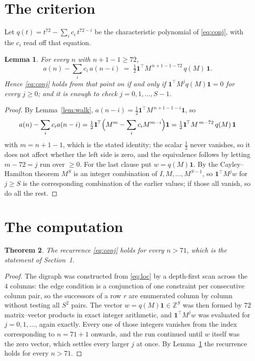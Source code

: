 \documentclass[11pt,a4paper]{article}
\theoremstyle{plain}
\newtheorem{theorem}{Theorem}
\newtheorem{lemma}[theorem]{Lemma}
\theoremstyle{definition}
\begin{document}
\section{The criterion}

Let $q(t)=t^{72}-\sum_i c_i\,t^{72-i}$ be the characteristic polynomial of
\eqref{eq:conj}, with the $c_i$ read off that equation.

\begin{lemma}\label{lem:crit}
For every $n$ with $n+1-1\ge72$,
\[
a(n)-\sum_i c_i\,a(n-i)\;=\;\tfrac1{2}\mathbf{1}^{\!\top}M^{\,n+1-1-72}\,q(M)\,\mathbf{1} .
\]
Hence \eqref{eq:conj} holds from that point on if and only if
$\mathbf{1}^{\!\top}M^{j}q(M)\mathbf{1}=0$ for every $j\ge0$; and it is enough to check
$j=0,1,\dots,S-1$.
\end{lemma}

\begin{proof}
By Lemma~\ref{lem:walk}, $a(n-i)=\tfrac1{2}\mathbf{1}^{\!\top}M^{\,n+1-1-i}\mathbf{1}$, so
\[
a(n)-\sum_i c_i a(n-i)
=\tfrac1{2}\mathbf{1}^{\!\top}\Bigl(M^{m}-\sum_i c_i M^{m-i}\Bigr)\mathbf{1}
=\tfrac1{2}\mathbf{1}^{\!\top}M^{\,m-72}\,q(M)\,\mathbf{1}
\]
with $m=n+1-1$, which is the stated identity; the scalar $\tfrac1{2}$ never vanishes, so it does not affect whether the left side is zero, and the equivalence follows by letting
$m-72=j$ run over $\ge0$. For the last clause put $w=q(M)\mathbf{1}$. By the
Cayley--Hamilton theorem $M^{S}$ is an integer combination of $I,M,\dots,M^{S-1}$, so
$\mathbf{1}^{\!\top}M^{j}w$ for $j\ge S$ is the corresponding combination of the earlier
values; if those all vanish, so do all the rest.
\end{proof}

\section{The computation}

\begin{theorem}
The recurrence \eqref{eq:conj} holds for every $n>71$, which is the statement of
Section~1.
\end{theorem}

\begin{proof}
The digraph was constructed from \eqref{eq:loc} by a depth-first scan across the $4$
columns: the edge condition is a conjunction of one constraint per consecutive column
pair, so the successors of a row $r$ are enumerated column by column without testing all
$S^2$ pairs. The vector $w=q(M)\mathbf{1}\in\mathbb{Z}^{S}$ was then formed by $72$
matrix--vector products in exact integer arithmetic, and $\mathbf{1}^{\!\top}M^{j}w$ was
evaluated for $j=0,1,\dots$, again exactly. Every one of those integers vanishes from the
index corresponding to $n=71+1$ onwards, and the run continued until $w$ itself was the
zero vector, which settles every larger $j$ at once. By Lemma~\ref{lem:crit} the recurrence
holds for every $n>71$.
\end{proof}
\end{document}
